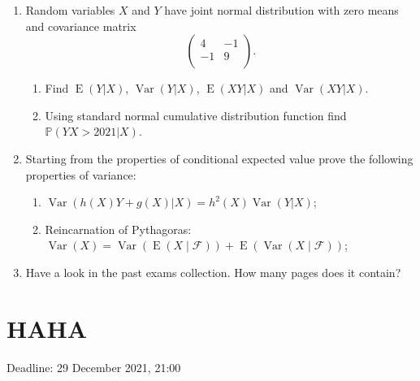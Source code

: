 \documentclass[12pt]{article}
\DeclareMathOperator{\Var}{Var}
\DeclareMathOperator{\E}{E}
\def \cF{\mathcal{F}}
\def \P{\mathbb{P}}
\begin{document}
\begin{enumerate}

\item Random variables $X$ and $Y$ have joint normal distribution with zero means and covariance matrix
\[
\begin{pmatrix}
4 & -1 \\
-1 & 9 \\
\end{pmatrix}.
\]

\begin{enumerate}
  \item Find $\E(Y|X)$, $\Var(Y|X)$, $\E(XY|X)$ and $\Var(XY|X)$.
  \item Using standard normal cumulative distribution function find $\P(YX > 2021 | X)$.
\end{enumerate}

\item Starting from the properties of conditional expected value prove the following properties
of variance:

\begin{enumerate}
  \item $\Var(h(X)Y + g(X)|X) = h^2(X)\Var(Y|X)$;
  \item Reincarnation of Pythagoras: $\Var(X) = \Var(\E(X \mid \cF)) + \E(\Var(X \mid \cF))$;
\end{enumerate}



\item Have a look in the past exams collection. How many pages does it contain?


\end{enumerate}



\newpage
\section{HAHA}


Deadline: 29 December 2021, 21:00
\end{document}
